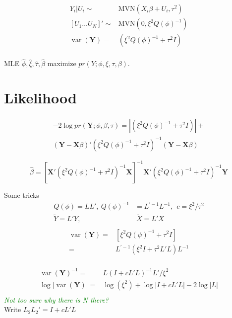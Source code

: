 \documentclass[12pt]{article}
\DeclareMathOperator{\var}{var}
\begin{document}
\begin{align*}
Y_i| U_i \sim & \text{MVN}(X_i\beta + U_i, \tau^2 )\\
[U_1 \ldots U_N]' \sim  & \text{MVN}(0, \xi^2 Q(\phi)^{-1})\\
\var(\mathbf{Y})  = &  ( \xi^2 Q(\phi)^{-1} + \tau^2 I  )  \\
\end{align*}

MLE  $\hat\phi, \hat\xi, \hat\tau,\hat\beta$  maximize $pr(Y ;
\phi,\xi,\tau,\beta)$.

\section*{Likelihood}
\begin{multline*}
-2 \log pr(\mathbf{Y};\phi,\beta,\tau) =
| (\xi^2  Q(\phi)^{-1} + \tau^2 I  ) | + \\
( \mathbf{Y} -\mathbf{X}\beta)  '
  (\xi^2  Q(\phi)^{-1} + \tau^2 I  )^{-1}
(\mathbf{Y} - \mathbf{X}\beta)
\end{multline*}

\[
\hat\beta = [ \mathbf{X}'
(  \xi^2  Q(\phi)^{-1} + \tau^2 I )^{-1}   \mathbf{X}]^{-1}
\mathbf{X}'(\xi^2  Q(\phi)^{-1} +
\tau^2 I  )^{-1} \mathbf{Y}
\]

Some tricks
\begin{align*}
 Q(\phi) = L L',\   Q(\phi)^{-1} &=L^{\prime-1} L^{-1}, \ \  c = \xi^2/\tau^2 \\
\tilde Y = L' Y,&  \  \tilde X = L' X\\
\end{align*}
\begin{align*}
\var(\mathbf{Y}) =&  [ \xi^2 Q(\psi)^{-1} +  \tau^2 I] \\
= &    L^{\prime -1}(  \xi^2I +   \tau^2 L'L  ) L^{-1}\\
\end{align*}


\begin{align*}
\var(\mathbf{Y})^{-1} = &    L(  I + c  L'L   )^{-1} L' / \xi^2\\
\log |\var(\mathbf{Y})| = & \log(\xi^2) + \log |I + c L'L| -2 \log |L|\\
\end{align*}
\textcolor{green}{\textit{Not too sure why there is N there?}}\\
Write $L_2 L_2' = I + c   L'L $
\end{document}
